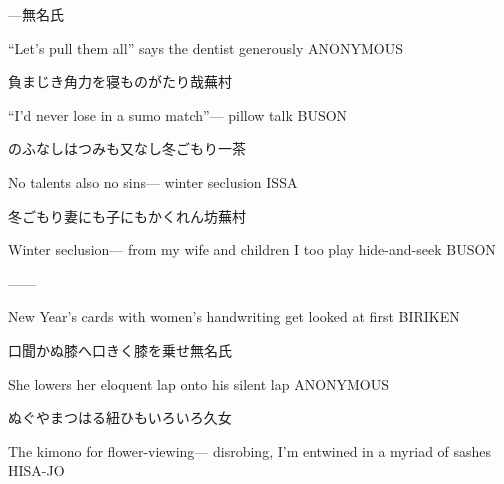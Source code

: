 \begin{haiku}
    {---}\hfill{\FH 無名氏}

    \vin{} ``Let's pull them all''
    \vin{} \vin{} says the dentist
    \vin{} \vin{} \vin{} generously \hspace{\fill} ANONYMOUS
\end{haiku}

\begin{haiku}
    {\FH 負まじき角力を寝ものがたり哉}\hfill{\FH 蕪村}

    \vin{} ``I'd never lose
    \vin{} \vin{} in a sumo match''---
    \vin{} \vin{} \vin{} pillow talk \hspace{\fill} BUSON
\end{haiku}

\begin{haiku}
    {\FH のふなしはつみも又なし冬ごもり}\hfill{\FH 一茶}

    \vin{} No talents
    \vin{} \vin{} also no sins---
    \vin{} \vin{} \vin{} winter seclusion \hspace{\fill} ISSA
\end{haiku}

\begin{haiku}
    {\FH 冬ごもり妻にも子にもかくれん坊}\hfill{\FH 蕪村}

    \vin{} Winter seclusion---
    \vin{} \vin{} from my wife and children
    \vin{} \vin{} \vin{} I too play hide-and-seek \hspace{\fill} BUSON
\end{haiku}

\begin{haiku}
   ---\hfill{---}

    \vin{} New Year's cards
    \vin{} \vin{} with women's handwriting
    \vin{} \vin{} \vin{} get looked at first \hspace{\fill} BIRIKEN
\end{haiku}

\begin{haiku}
    {口聞かぬ膝へ口きく膝を乗せ}\hfill{\FH 無名氏}

    \vin{} She lowers
    \vin{} \vin{} her eloquent lap
    \vin{} \vin{} \vin{} onto his silent lap \hspace{\fill} ANONYMOUS
\end{haiku}

\begin{haiku}
    {\FH {}ぬぐやまつはる紐{ひも}いろいろ}\hfill{\FH 久女}

    \vin{} The kimono for flower-viewing---
    \vin{} \vin{} disrobing, I'm entwined in
    \vin{} \vin{} \vin{} a myriad of sashes \hspace{\fill} HISA-JO
\end{haiku}

